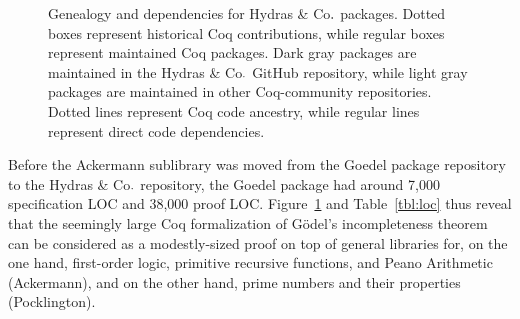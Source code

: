 \documentclass{easychair}
\newcommand{\coq}{Coq\xspace}
\newcommand{\community}{Coq-community\xspace}
\newcommand{\Hydras}{Hydras \& Co$\text.$\xspace}
\begin{document}
\begin{figure}[ht]
{
}
\caption{Genealogy and dependencies for \Hydras packages. Dotted boxes represent historical Coq contributions, while regular boxes represent maintained \coq packages. Dark gray packages are maintained in the \Hydras GitHub repository, while light gray packages are maintained in other \community repositories. Dotted lines represent \coq code ancestry, while regular lines represent direct code dependencies.}
  \label{fig:genealogy}
\end{figure}

Before the Ackermann sublibrary was moved from the Goedel package repository to the \Hydras repository, the Goedel package had around 7,000 specification LOC and 38,000 proof LOC. Figure~\ref{fig:genealogy} and Table~\ref{tbl:loc} thus reveal that the seemingly large Coq formalization of G\"{o}del's incompleteness theorem can be considered as a modestly-sized proof on top of general libraries for, on the one hand, first-order logic, primitive recursive functions, and Peano Arithmetic (Ackermann), and on the other hand, prime numbers and their properties (Pocklington).
\end{document}
